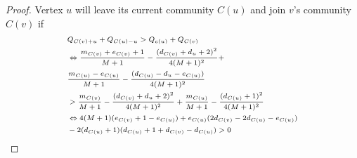 \begin{proof}
Vertex $u$ will leave its current community $C(u)$ and join $v$'s community $C(v)$ if\\
\[\scriptsize
\begin{split}
& Q_{C(v)+u} + Q_{C(u)-u} > Q_{c(u)} + Q_{C(v)}\\
&\Leftrightarrow \frac{m_{C(v)}+e_{C(v)}+1}{M+1} - \frac{(d_{C(v)}+d_u+2)^2}{4(M+1)^2}+\\
&\frac{m_{C(u)} - e_{C(u)}}{M+1} - \frac{(d_{C(u)}-d_u-e_{C(u)})}{4(M+1)^2} \\
& > \frac{m_{C(v)}}{M+1} - \frac{(d_{C(v)}+d_u+2)^2}{4(M+1)^2} + \frac{m_{C(u)}}{M+1} - \frac{(d_{C(u)}+1)^2}{4(M+1)^2}\\
&\Leftrightarrow 4(M+1)(e_{C(v)} +1 -e_{C(u)}) + e_{C(u)}(2d_{C(v)} - 2d_{C(u)}-e_{C(u)})\\
& - 2(d_{C(u)}+1)(d_{C(u)}+1+d_{C(v)}-d_{C(u)})>0
\end{split}\]
\end{proof}
